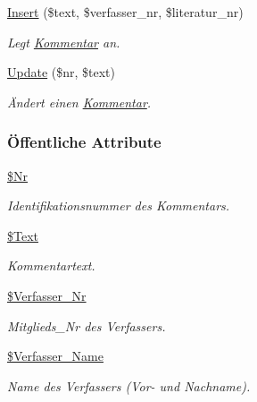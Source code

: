 \begin{CompactItemize}
\hyperlink{classKommentar_6119b3c12a61d8d5a41cded165517914}{Insert} (\$text, \$verfasser\_\-nr, \$literatur\_\-nr)
\begin{CompactList}\small\item\em Legt \hyperlink{classKommentar}{Kommentar} an. \item\end{CompactList}\item 
\hyperlink{classKommentar_0b3e20e910493e67b67b747243f04511}{Update} (\$nr, \$text)
\begin{CompactList}\small\item\em Ändert einen \hyperlink{classKommentar}{Kommentar}. \item\end{CompactList}\end{CompactItemize}
\subsubsection*{\"{O}ffentliche Attribute}
\begin{CompactItemize}
\item 
\hyperlink{classKommentar_1b0a3cfcb9fc7075f985cc8067ab1982}{\$Nr}
\begin{CompactList}\small\item\em Identifikationsnummer des Kommentars. \item\end{CompactList}\item 
\hyperlink{classKommentar_c9a481413d6ba0c000719ad514bad4b5}{\$Text}
\begin{CompactList}\small\item\em Kommentartext. \item\end{CompactList}\item 
\hyperlink{classKommentar_c92b002e40690ee052fec446ff2a0ef6}{\$Verfasser\_\-Nr}
\begin{CompactList}\small\item\em Mitglieds\_\-Nr des Verfassers. \item\end{CompactList}\item 
\hyperlink{classKommentar_84f0fc10295968adde28169f8df018d9}{\$Verfasser\_\-Name}
\begin{CompactList}\small\item\em Name des Verfassers (Vor- und Nachname). \item\end{CompactList}\end{CompactItemize}


